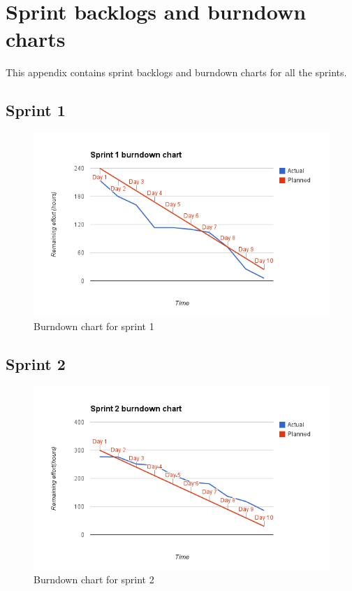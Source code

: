 \chapter{Sprint backlogs and burndown charts}
This appendix contains sprint backlogs and burndown charts for all the sprints.

\section{Sprint 1}
\begin{figure}[H]
\includegraphics[width=\textwidth]{appendix/backlog/burndown1.png}
\caption{Burndown chart for sprint 1}
\end{figure}


\section{Sprint 2}
\begin{figure}[H]
\includegraphics[width=\textwidth]{appendix/backlog/burndown2.png}
\caption{Burndown chart for sprint 2}
\end{figure}


